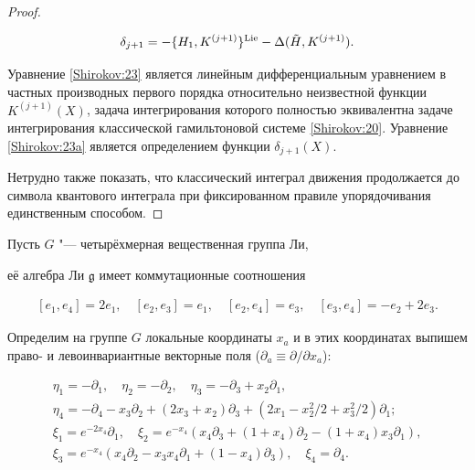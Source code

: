 \begin{proof}
\begin{equation}
\end{equation}

\begin{equation}

\label{Shirokov:23a}

\delta_{j+1}=-\{H_1,K^{(j+1)}\}^{\rm Lie}-\Delta(\tilde{H},K^{(j+1)}).

\end{equation}



Уравнение \eqref{Shirokov:23} является линейным дифференциальным уравнением \linebreak в частных производных первого порядка относительно неизвестной функции $ K^{(j+1)}(X) $, задача интегрирования которого полностью эквивалентна задаче интегрирования классической гамильтоновой системе \eqref{Shirokov:20}. Уравнение \eqref{Shirokov:23a} является определением функции $ \delta_{j+1}(X) $.

Нетрудно также показать, что классический интеграл движения продолжается до символа квантового интеграла при фиксированном правиле упорядочивания единственным способом.

\end{proof}



\smallskip




Пусть $G$ "--- четырёхмерная вещественная группа Ли, 

её алгебра Ли $\mathfrak{g}$ имеет коммутационные соотношения 

\begin{eqnarray}

\label{comm_alg}

[e_{{1}},e_{{4}}] =2 e_{{1}},\quad [e_{{2}},e_{{3}}]=e_{{1}},\quad [e_{{2}},e_{{4}}]=e_{{3}},\quad [e_{{3}},e_{{4}}]=-e_{{2}}+2 e_{{3}}.

\end{eqnarray}

Определим на группе $ G $ локальные координаты $x_a$ и в этих координатах выпишем право- и левоинвариантные векторные поля ($ \partial_a\equiv \partial/\partial {x_a} $):

\begin{gather*}

\eta_{1}=-\partial_1, \quad  \eta_{2}=-\partial_2, \quad \eta_{3}=-\partial_3+x_2\partial_1, \\ 

\eta_{4}=-\partial_4-x_3\partial_2+(2x_3+x_2)\partial_3 +(2x_1- x_2^2/2+x_3^2/2)\partial_1;\\

\xi_1=e^{-2x_4}\partial_1, \quad  \xi_2=e^{-x_4}(x_4\partial_3+(1+x_4 )\partial_2-(1+x_4 )x_3\partial_1 ),\\ 

\xi_3=e^{-x_4}(x_4\partial_2-x_3x_4\partial_1 +(1-x_4)\partial_3 ),\quad   \xi_4=\partial_4.

\end{gather*}



